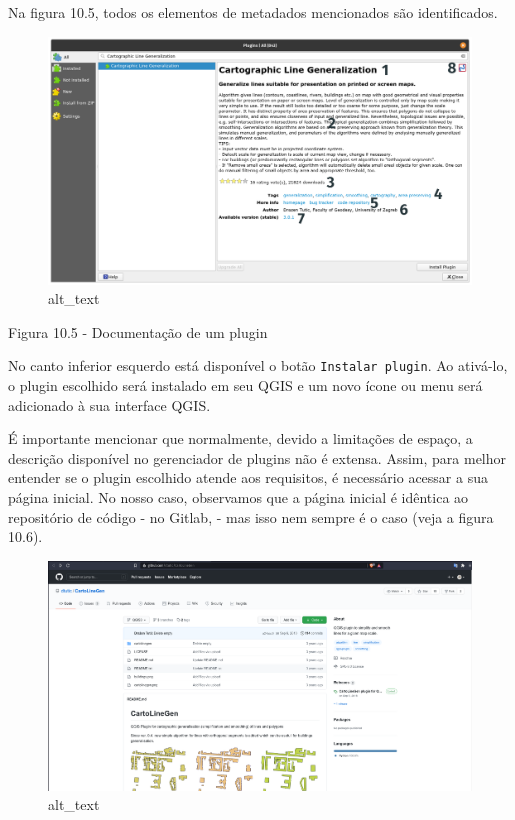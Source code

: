 \documentclass[
]{book}
\begin{document}
Na figura 10.5, todos os elementos de metadados mencionados são identificados.

\begin{figure}
\centering
\includegraphics{media/modulo10/fig105.png}
\caption{alt\_text}
\end{figure}

Figura 10.5 - Documentação de um plugin

No canto inferior esquerdo está disponível o botão \texttt{Instalar\ plugin}. Ao ativá-lo, o plugin escolhido será instalado em seu QGIS e um novo ícone ou menu será adicionado à sua interface QGIS.

É importante mencionar que normalmente, devido a limitações de espaço, a descrição disponível no gerenciador de plugins não é extensa. Assim, para melhor entender se o plugin escolhido atende aos requisitos, é necessário acessar a sua página inicial. No nosso caso, observamos que a página inicial é idêntica ao repositório de código - no Gitlab, - mas isso nem sempre é o caso (veja a figura 10.6).

\begin{figure}
\centering
\includegraphics{media/modulo10/fig106_a.png}
\caption{alt\_text}
\end{figure}
\end{document}
